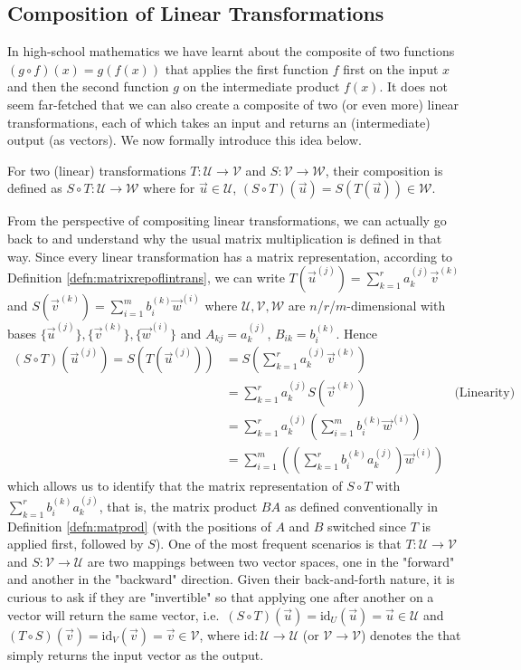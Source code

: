 \subsection{Composition of Linear Transformations}

In high-school mathematics we have learnt about the composite of two functions $(g \circ f)(x) = g(f(x))$ that applies the first function $f$ first on the input $x$ and then the second function $g$ on the intermediate product $f(x)$. It does not seem far-fetched that we can also create a composite of two (or even more) linear transformations, each of which takes an input and returns an (intermediate) output (as vectors). We now formally introduce this idea below.
\begin{defn}
For two (linear) transformations $T: \mathcal{U} \to \mathcal{V}$ and $S: \mathcal{V} \to \mathcal{W}$, their composition is defined as $S \circ T: \mathcal{U} \to \mathcal{W}$ where for $\vec{u} \in \mathcal{U}$, $(S \circ T)(\vec{u}) = S(T(\vec{u})) \in \mathcal{W}$.
\end{defn}
From the perspective of compositing linear transformations, we can actually go back to and understand why the usual matrix multiplication is defined in that way. Since every linear transformation has a matrix representation, according to Definition \ref{defn:matrixrepoflintrans}, we can write $T(\vec{u}^{(j)}) = \sum_{k=1}^{r} a_k^{(j)}\vec{v}^{(k)}$ and $S(\vec{v}^{(k)}) = \sum_{i=1}^{m} b_i^{(k)}\vec{w}^{(i)}$ where $\mathcal{U}, \mathcal{V}, \mathcal{W}$ are $n$/$r$/$m$-dimensional with bases $\{\vec{u}^{(j)}\}, \{\vec{v}^{(k)}\}, \{\vec{w}^{(i)}\}$ and $A_{kj} = a_k^{(j)}$, $B_{ik} = b_i^{(k)}$. Hence
\begin{align*}
(S \circ T)(\vec{u}^{(j)}) = S(T(\vec{u}^{(j)})) &= S(\sum_{k=1}^{r} a_k^{(j)}\vec{v}^{(k)}) \\
&= \sum_{k=1}^{r} a_k^{(j)}S(\vec{v}^{(k)}) & \text{(Linearity)} \\
&= \sum_{k=1}^{r} a_k^{(j)}(\sum_{i=1}^{m} b_i^{(k)}\vec{w}^{(i)}) \\
&= \sum_{i=1}^{m} \left((\sum_{k=1}^{r} b_i^{(k)} a_k^{(j)}) \vec{w}^{(i)}\right) 
\end{align*}
which allows us to identify that the matrix representation of $S \circ T$ with $\sum_{k=1}^{r} b_i^{(k)} a_k^{(j)}$, that is, the matrix product $BA$ as defined conventionally in Definition \ref{defn:matprod} (with the positions of $A$ and $B$ switched since $T$ is applied first, followed by $S$). One of the most frequent scenarios is that $T: \mathcal{U} \to \mathcal{V}$ and $S: \mathcal{V} \to \mathcal{U}$ are two mappings between two vector spaces, one in the "forward" and another in the "backward" direction. Given their back-and-forth nature, it is curious to ask if they are "invertible" so that applying one after another on a vector will return the same vector, i.e.\ $(S \circ T)(\vec{u}) = \text{id}_{U}(\vec{u}) = \vec{u} \in \mathcal{U}$ and $(T \circ S)(\vec{v}) = \text{id}_{V}(\vec{v}) = \vec{v} \in \mathcal{V}$, where $\text{id}: \mathcal{U} \to \mathcal{U}$ (or $\mathcal{V} \to \mathcal{V}$) denotes the  that simply returns the input vector as the output.
